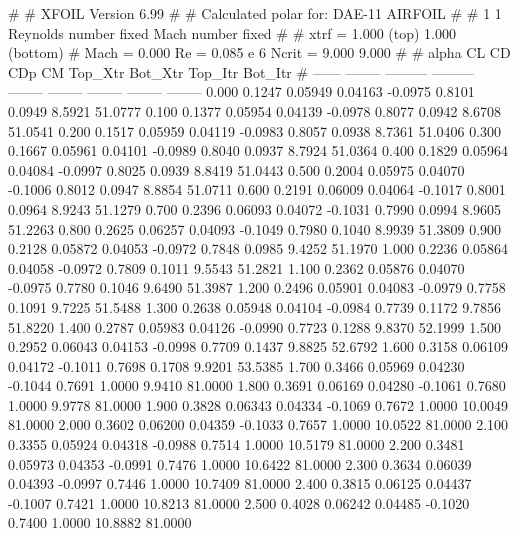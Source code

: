 #  
#       XFOIL         Version 6.99
#  
# Calculated polar for: DAE-11 AIRFOIL                                  
#  
# 1 1 Reynolds number fixed          Mach number fixed         
#  
# xtrf =   1.000 (top)        1.000 (bottom)  
# Mach =   0.000     Re =     0.085 e 6     Ncrit =   9.000  9.000
#  
#   alpha    CL        CD       CDp       CM     Top_Xtr  Bot_Xtr  Top_Itr  Bot_Itr
#  ------ -------- --------- --------- -------- -------- -------- -------- --------
   0.000   0.1247   0.05949   0.04163  -0.0975   0.8101   0.0949   8.5921  51.0777
   0.100   0.1377   0.05954   0.04139  -0.0978   0.8077   0.0942   8.6708  51.0541
   0.200   0.1517   0.05959   0.04119  -0.0983   0.8057   0.0938   8.7361  51.0406
   0.300   0.1667   0.05961   0.04101  -0.0989   0.8040   0.0937   8.7924  51.0364
   0.400   0.1829   0.05964   0.04084  -0.0997   0.8025   0.0939   8.8419  51.0443
   0.500   0.2004   0.05975   0.04070  -0.1006   0.8012   0.0947   8.8854  51.0711
   0.600   0.2191   0.06009   0.04064  -0.1017   0.8001   0.0964   8.9243  51.1279
   0.700   0.2396   0.06093   0.04072  -0.1031   0.7990   0.0994   8.9605  51.2263
   0.800   0.2625   0.06257   0.04093  -0.1049   0.7980   0.1040   8.9939  51.3809
   0.900   0.2128   0.05872   0.04053  -0.0972   0.7848   0.0985   9.4252  51.1970
   1.000   0.2236   0.05864   0.04058  -0.0972   0.7809   0.1011   9.5543  51.2821
   1.100   0.2362   0.05876   0.04070  -0.0975   0.7780   0.1046   9.6490  51.3987
   1.200   0.2496   0.05901   0.04083  -0.0979   0.7758   0.1091   9.7225  51.5488
   1.300   0.2638   0.05948   0.04104  -0.0984   0.7739   0.1172   9.7856  51.8220
   1.400   0.2787   0.05983   0.04126  -0.0990   0.7723   0.1288   9.8370  52.1999
   1.500   0.2952   0.06043   0.04153  -0.0998   0.7709   0.1437   9.8825  52.6792
   1.600   0.3158   0.06109   0.04172  -0.1011   0.7698   0.1708   9.9201  53.5385
   1.700   0.3466   0.05969   0.04230  -0.1044   0.7691   1.0000   9.9410  81.0000
   1.800   0.3691   0.06169   0.04280  -0.1061   0.7680   1.0000   9.9778  81.0000
   1.900   0.3828   0.06343   0.04334  -0.1069   0.7672   1.0000  10.0049  81.0000
   2.000   0.3602   0.06200   0.04359  -0.1033   0.7657   1.0000  10.0522  81.0000
   2.100   0.3355   0.05924   0.04318  -0.0988   0.7514   1.0000  10.5179  81.0000
   2.200   0.3481   0.05973   0.04353  -0.0991   0.7476   1.0000  10.6422  81.0000
   2.300   0.3634   0.06039   0.04393  -0.0997   0.7446   1.0000  10.7409  81.0000
   2.400   0.3815   0.06125   0.04437  -0.1007   0.7421   1.0000  10.8213  81.0000
   2.500   0.4028   0.06242   0.04485  -0.1020   0.7400   1.0000  10.8882  81.0000
